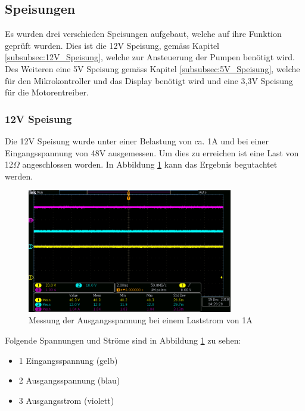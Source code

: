 \subsection{Speisungen}\label{subsec:Hardware_Speisungen}

Es wurden drei verschieden Speisungen aufgebaut, welche auf ihre Funktion geprüft wurden. Dies ist die 12V Speisung, gemäss Kapitel \ref{subsubsec:12V_Speisung}, welche zur Ansteuerung der Pumpen benötigt wird. Des Weiteren eine 5V Speisung gemäss Kapitel \ref{subsubsec:5V_Speisung}, welche für den Mikrokontroller und das Display benötigt wird und eine 3,3V Speisung für die Motorentreiber. 

\subsubsection{12V Speisung}\label{subsubsec:Hardware_Verifikation_12V_Speisunge}

Die 12V Speisung wurde unter einer Belastung von ca. 1A und bei einer Eingangsspannung von 48V ausgemessen. Um dies zu erreichen ist eine Last von 12$\Omega$ angeschlossen worden. In Abbildung \ref{fig:Eingan_Ausgang_Strom_12V} kann das Ergebnis begutachtet werden. 

\begin{figure}[h!]
	\centering
	\includegraphics[width=0.8\textwidth]{graphics/Eingan_Ausgang_Strom_12V.png}
	\caption{Messung der Ausgangsspannung bei einem Laststrom von 1A} 
	\label{fig:Eingan_Ausgang_Strom_12V}
\end{figure}

Folgende Spannungen und Ströme sind in Abbildung \ref{fig:Eingan_Ausgang_Strom_12V} zu sehen: 

\begin{itemize}
	\item 1 Eingangsspannung (gelb)
	\item 2 Ausgangsspannung (blau)
	\item 3 Ausgangsstrom (violett)
\end{itemize}
 
